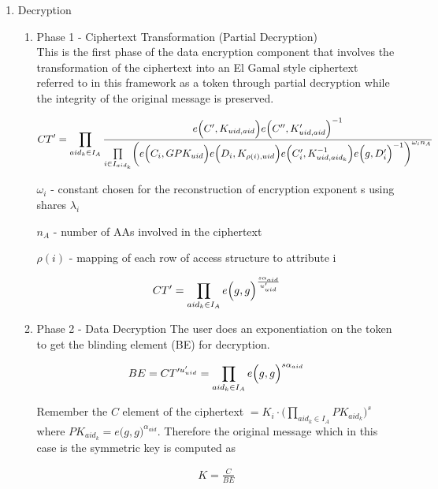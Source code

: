 \begin{enumerate}
	\item Decryption
	\begin{enumerate}
		
		\item Phase 1 - Ciphertext Transformation (Partial Decryption)\\
		This is the first phase of the data encryption component that involves the transformation of the ciphertext into an El Gamal style ciphertext referred to in this framework as a token through partial decryption while the integrity of the original message is preserved.
		
		\begin{align*}
			CT' = \prod\limits_{aid_{k} \in I_{A}} \frac{e\Bigl(C', K_{uid,aid}\Bigl)e\Bigl(C'', K'_{uid,aid}\Bigl)^{-1}}{\prod\limits_{i \in I_{aid_k}}\biggl(e\Bigl(C_i, GPK_{uid}\Bigl)e\Bigl(D_i, K_{\rho(i),uid}\Bigl)e\Bigl(C'_i, K_{uid,aid_k}^{-1}\Bigl)e\Bigl(g, D'_i\Bigl)^{-1}\biggl)^{\omega_{i}n_A}}
		\end{align*}
		
		$\omega_{i}$ - constant chosen for the reconstruction of encryption exponent s using shares $\lambda_{i}$
		
		$n_A$ - number of AAs involved in the ciphertext
		
		$\rho(i)$ - mapping of each row of access structure to attribute i
		
		\begin{align*}
			CT' = \prod\limits_{aid_{k} \in I_{A}} e\Bigl(g, g\Bigl)^{\frac{s\alpha_{aid}}{u'_{uid}}}
		\end{align*}
		
		
		\item Phase 2 - Data Decryption
		The user does an exponentiation on the token to get the blinding element (BE) for decryption.
		
		\begin{align*}
			BE= CT'^{u'_{uid}} = \prod\limits_{aid_{k} \in I_{A}} e\Bigl(g, g\Bigl)^{s\alpha_{aid}}
		\end{align*}
		
		Remember the $C$ element of the ciphertext $= K_i\cdot\bigl(\prod\limits_{aid_{k} \in I_{A}}PK_{aid_{k}}\bigl)^{s}$ where $PK_{aid_{k}} = e\bigl(g, g\bigl)^{\alpha_{aid}}$. Therefore the original message which in this case is the symmetric key is computed as
		
		\begin{align*}
			K = \frac{C}{BE}
		\end{align*}
	\end{enumerate}
	

\end{enumerate}
